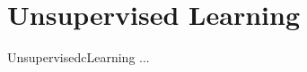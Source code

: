 \documentclass[12pt,letter]{article}
\begin{document}
	
	\setcounter{section}{5}	
	\setcounter{figure}{0}   
	\renewcommand\thefigure{\thesection.\arabic{figure}}
	\setcounter{equation}{0}   
	\renewcommand\theequation{\thesection.\arabic{equation}}
	\section{Unsupervised Learning}

UnsupervisedcLearning ...
\end{document}
